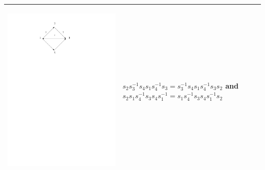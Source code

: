 \documentclass[11pt]{amsart}
\theoremstyle{definition}
\begin{document}
\begin{table}
\begin{tabular}{| p{3.5cm} | p{7cm} |}
\begin{center}\includegraphics[scale = .30]{Diagram3.pdf}\end{center} & $s_{2}s_{3}^{-1}s_{4}s_{1}s_{4}^{-1}s_{3} = s_{3}^{-1}s_{4}s_{1}s_{4}^{-1}s_{3}s_{2}$ and
$s_{2}s_{1}s_{4}^{-1}s_{3}s_{4}s_{1}^{-1} = s_{1}s_{4}^{-1}s_{3}s_{4}s_{1}^{-1}s_{2}$\\ \hline


\end{tabular}
\end{table}
\end{document}
